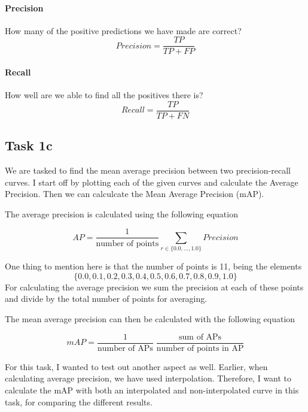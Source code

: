\paragraph{Precision} How many of the positive predictions we have made are correct?
\begin{equation*}
    Precision = \frac{TP}{TP + FP}
\end{equation*}
\paragraph{Recall} How well are we able to find all the positives there is?
\begin{equation*}
    Recall = \frac{TP}{TP + FN}
\end{equation*}

\subsection*{Task 1c}
We are tasked to find the mean average precision between two precision-recall curves.
I start off by plotting each of the given curves and calculate the Average Precision.
Then we can calculcate the Mean Average Precision (mAP).

The average precision is calculated using the following equation

\begin{equation*}
    AP = \frac{1}{\text{number of points}} \displaystyle\sum_{r \in \{0.0,...,1.0\}}  Precision
\end{equation*}

One thing to mention here is that the number of points is 11, being the elements $$\{0.0, 0.1, 0.2, 0.3, 0.4, 0.5, 0.6, 0.7, 0.8, 0.9, 1.0\}$$
For calculating the average precision we sum the precision at each of these points and divide by the total number of points for averaging.


The mean average precision can then be calculated with the following equation

\begin{equation*}
    mAP = \frac{1}{\text{number of APs}}\;\frac{\text{sum of APs}}{\text{number of points in AP}}
\end{equation*}


For this task, I wanted to test out another aspect as well. 
Earlier, when calculating average precision, we have used interpolation.
Therefore, I want to calculate the mAP with both an interpolated and non-interpolated curve in this task, for comparing the different results.

